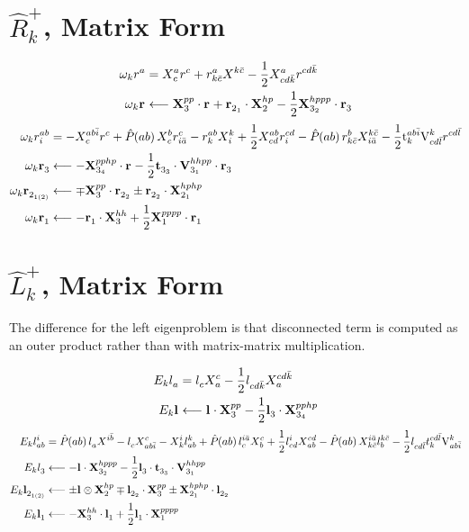 \documentclass[thesis.tex]{subfiles}
\begin{document}
\section{$\hat{R}^{+}_{k}$, Matrix Form}

\begin{align}
  \omega_{k}r^{a}_{} &= X^{a}_{\hspace{0.3pt} c}r^{c}_{} + r^{a}_{k\bar{c}}X^{k\bar{c}}_{\hspace{0.3pt} } - \frac{1}{2}X^{a}_{\hspace{0.3pt} cd\bar{k}}r^{cd\bar{k}}_{} \notag \\
  \omega_{k}\mathbf{r}^{}_{} &\longleftarrow \mathbf{X}^{pp}_{\hspace{0.3pt} 3}\cdot\mathbf{r}^{}_{} + \mathbf{r}^{}_{2_{1}}\cdot\mathbf{X}^{hp}_{\hspace{0.3pt} 2} - \frac{1}{2}\mathbf{X}^{hppp}_{\hspace{0.3pt} 3_{2}}\cdot\mathbf{r}^{}_{3}
\end{align}
\begin{align}
  \omega_{k}r^{ab}_{i} &= -X^{ab\bar{i}}_{\hspace{0.3pt} c}r^{c}_{} + \mathop{\hat{P}\hspace{-2pt}\left( ab\right) }X^{b}_{\hspace{0.3pt} c}r^{c}_{i\bar{a}} - r^{ab}_{k}X^{k}_{\hspace{0.3pt} i} + \frac{1}{2}X^{ab}_{\hspace{0.3pt} cd}r^{cd}_{i} - \mathop{\hat{P}\hspace{-2pt}\left( ab\right) }r^{b}_{k\bar{c}}X^{k\bar{c}}_{\hspace{0.3pt} i\bar{a}}  - \frac{1}{2}\text{t}^{ab\bar{i}}_{k}\text{V}^{k}_{cd\bar{l}}r^{cd\bar{l}}_{} \notag \\
  \omega_{k}\mathbf{r}^{}_{3} &\longleftarrow -\mathbf{X}^{pphp}_{\hspace{0.3pt} 3_{4}}\cdot\mathbf{r}^{}_{} - \frac{1}{2}\mathbf{t}^{}_{3_{3}}\cdot\text{\textbf{V}}^{hhpp}_{3_{1}}\cdot\mathbf{r}^{}_{3} \notag \\
  \omega_{k}\mathbf{r}^{}_{2_{1(2)}} &\longleftarrow \mp\mathbf{X}^{pp}_{\hspace{0.3pt} 3}\cdot\mathbf{r}^{}_{2_{2}} \pm\mathbf{r}^{}_{2_{2}}\cdot\mathbf{X}^{hphp}_{\hspace{0.3pt} 2_{1}} \notag \\
  \omega_{k}\mathbf{r}^{}_{1} &\longleftarrow -\mathbf{r}^{}_{1}\cdot\mathbf{X}^{hh}_{\hspace{0.3pt} 3} + \frac{1}{2}\mathbf{X}^{pppp}_{\hspace{0.3pt} 1}\cdot\mathbf{r}^{}_{1}
\end{align}


\section{$\hat{L}^{+}_{k}$, Matrix Form}
The difference for the left eigenproblem is that disconnected term is computed as an outer product rather than with matrix-matrix multiplication.

\begin{align}
  E_{k}l^{}_{a} &= l^{}_{c}X^{c}_{\hspace{0.3pt} a} - \frac{1}{2}l^{}_{cd\bar{k}}X^{cd\bar{k}}_{\hspace{0.3pt} a} \notag \\
  E_{k}\mathbf{l}^{}_{} &\longleftarrow \mathbf{l}^{}_{}\cdot\mathbf{X}^{pp}_{\hspace{0.3pt} 3} - \frac{1}{2}\mathbf{l}^{}_{3}\cdot\mathbf{X}^{pphp}_{\hspace{0.3pt} 3_{4}}
\end{align} 
\begin{align}
  E_{k}l^{i}_{ab} &= \mathop{\hat{P}\hspace{-2pt}\left( ab\right) }l^{}_{a}X^{i\bar{b}}_{\hspace{0.3pt} } - l^{}_{c}X^{c}_{\hspace{0.3pt} ab\bar{i}} - X^{i}_{\hspace{0.3pt} k}l^{k}_{ab} + \mathop{\hat{P}\hspace{-2pt}\left( ab\right) }l^{i\bar{a}}_{c}X^{c}_{\hspace{0.3pt} b} + \frac{1}{2}l^{i}_{cd}X^{cd}_{\hspace{0.3pt} ab} - \mathop{\hat{P}\hspace{-2pt}\left( ab\right) }X^{i\bar{a}}_{\hspace{0.3pt} k\bar{c}}l^{k\bar{c}}_{b} - \frac{1}{2}l^{}_{cd\bar{l}}t^{cd\bar{l}}_{k}\text{V}^{k}_{ab\bar{i}} \notag \\
  E_{k}l^{}_{3} &\longleftarrow -\mathbf{l}^{}_{}\cdot\mathbf{X}^{hppp}_{\hspace{0.3pt} 3_{2}} - \frac{1}{2}\mathbf{l}^{}_{3}\cdot\mathbf{t}^{}_{3_{3}}\cdot\text{\textbf{V}}^{hhpp}_{3_{1}} \notag \\
  E_{k}\mathbf{l}^{}_{2_{1(2)}} &\longleftarrow \pm\mathbf{l}^{}_{}\otimes\mathbf{X}^{hp}_{\hspace{0.3pt} 2} \mp\mathbf{l}^{}_{2_{2}}\cdot\mathbf{X}^{pp}_{\hspace{0.3pt} 3} \pm\mathbf{X}^{hphp}_{\hspace{0.3pt} 2_{1}}\cdot\mathbf{l}^{}_{2_{2}} \notag \\
  E_{k}\mathbf{l}^{}_{1} &\longleftarrow -\mathbf{X}^{hh}_{\hspace{0.3pt} 3}\cdot\mathbf{l}^{}_{1} + \frac{1}{2}\mathbf{l}^{}_{1}\cdot\mathbf{X}^{pppp}_{\hspace{0.3pt} 1}
\end{align}
\end{document}
